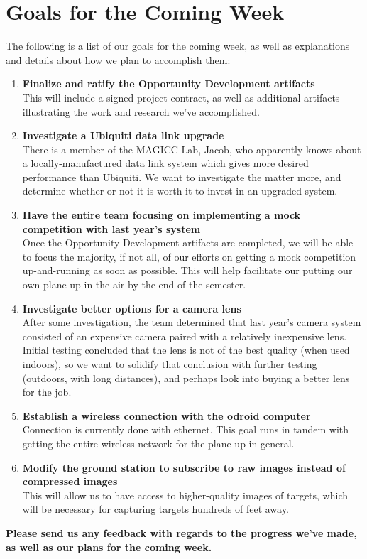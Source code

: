 \documentclass[]{../auvsi_doc}
\begin{document}
\section{Goals for the Coming Week}

The following is a list of our goals for the coming week, as well as explanations and details about how we plan to accomplish them:

\begin{enumerate}
\item \textbf{Finalize and ratify the Opportunity Development artifacts}\\
This will include a signed project contract, as well as additional artifacts illustrating the work and research we've accomplished.
\item \textbf{Investigate a Ubiquiti data link upgrade}\\
There is a member of the MAGICC Lab, Jacob, who apparently knows about a locally-manufactured data link system which gives more desired performance than Ubiquiti. We want to investigate the matter more, and determine whether or not it is worth it to invest in an upgraded system.
\item \textbf{Have the entire team focusing on implementing a mock competition with last year's system}\\
Once the Opportunity Development artifacts are completed, we will be able to focus the majority, if not all, of our efforts on getting a mock competition up-and-running as soon as possible. This will help facilitate our putting our own plane up in the air by the end of the semester.
\item \textbf{Investigate better options for a camera lens}\\
After some investigation, the team determined that last year's camera system consisted of an expensive camera paired with a relatively inexpensive lens. Initial testing concluded that the lens is not of the best quality (when used indoors), so we want to solidify that conclusion with further testing (outdoors, with long distances), and perhaps look into buying a better lens for the job.
\item \textbf{Establish a wireless connection with the odroid computer}\\
Connection is currently done with ethernet. This goal runs in tandem with getting the entire wireless network for the plane up in general.
\item \textbf{Modify the ground station to subscribe to raw images instead of compressed images}\\
This will allow us to have access to higher-quality images of targets, which will be necessary for capturing targets hundreds of feet away.
\end{enumerate}

\textbf{Please send us any feedback with regards to the progress we've made, as well as our plans for the coming week.}
\end{document}
